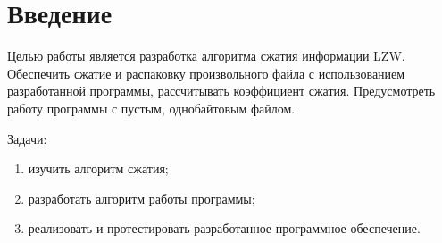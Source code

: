\section*{Введение}

Целью работы является разработка алгоритма сжатия информации LZW. Обеспечить
сжатие и распаковку произвольного файла с использованием разработанной
программы, рассчитывать коэффициент сжатия. Предусмотреть работу программы с
пустым, однобайтовым файлом. 

Задачи:
\begin{enumerate}
    \item изучить алгоритм сжатия;
    \item разработать алгоритм работы программы;
    \item реализовать и протестировать разработанное программное обеспечение.
\end{enumerate}

\pagebreak

